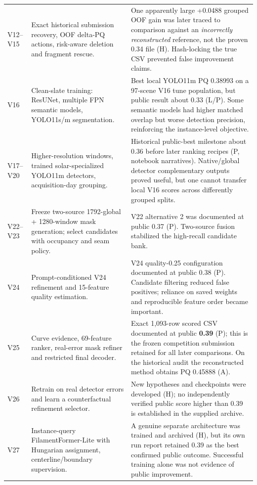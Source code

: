 \documentclass[11pt,a4paper]{article}
\begin{document}
\begin{longtable}{p{}p{}p{}}
V12--V15 & Exact historical submission recovery, OOF delta-PQ actions, risk-aware deletion and fragment rescue. & One apparently large +0.0488 grouped OOF gain was later traced to comparison against an \emph{incorrectly reconstructed} reference, not the proven 0.34 file (H). Hash-locking the true CSV prevented false improvement claims.\\
V16 & Clean-slate training: ResUNet, multiple FPN semantic models, YOLO11s/m segmentation. & Best local YOLO11m PQ 0.38993 on a 97-scene V16 tune population, but public result about 0.33 (L/P). Some semantic models had higher matched overlap but worse detection precision, reinforcing the instance-level objective.\\
V17--V20 & Higher-resolution windows, trained solar-specialized YOLO11m detectors, acquisition-day grouping. & Historical public-best milestone about 0.36 before later ranking recipes (P, notebook narratives). Native/global detector complementary outputs proved useful, but one cannot transfer local V16 scores across differently grouped splits.\\
V22--V23 & Freeze two-source 1792-global + 1280-window mask generation; select candidates with occupancy and seam policy. & V22 alternative 2 was documented at public 0.37 (P). Two-source fusion stabilized the high-recall candidate bank.\\
V24 & Prompt-conditioned V24 refinement and 15-feature quality estimation. & V24 quality-0.25 configuration documented at public 0.38 (P). Candidate filtering reduced false positives; reliance on saved weights and reproducible feature order became important.\\
V25 & Curve evidence, 69-feature ranker, real-error mask refiner and restricted final decoder. & Exact 1,093-row scored CSV documented at public \textbf{0.39} (P); this is the frozen competition submission retained for all later comparisons. On the historical audit the reconstructed method obtains PQ 0.45888 (A).\\
V26 & Retrain on real detector errors and learn a counterfactual refinement selector. & New hypotheses and checkpoints were developed (H); no independently verified public score higher than 0.39 is established in the supplied archive.\\
V27 & Instance-query FilamentFormer-Lite with Hungarian assignment, centerline/boundary supervision. & A genuine separate architecture was trained and archived (H), but its own run report retained 0.39 as the best confirmed public outcome. Successful training alone was not evidence of public improvement.\\

\end{longtable}
\end{document}

